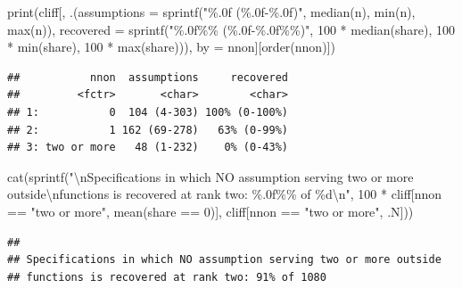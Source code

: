 \documentclass[
  11pt,
]{article}
\newenvironment{Shaded}{\begin{snugshade}}{\end{snugshade}}
\newcommand{\AttributeTok}[1]{\textcolor[rgb]{0.77,0.63,0.00}{#1}}
\newcommand{\DecValTok}[1]{\textcolor[rgb]{0.00,0.00,0.81}{#1}}
\newcommand{\FunctionTok}[1]{\textcolor[rgb]{0.00,0.00,0.00}{#1}}
\newcommand{\NormalTok}[1]{#1}
\newcommand{\SpecialCharTok}[1]{\textcolor[rgb]{0.00,0.00,0.00}{#1}}
\newcommand{\StringTok}[1]{\textcolor[rgb]{0.31,0.60,0.02}{#1}}
\begin{document}
\begin{Shaded}
\begin{Highlighting}[]
\FunctionTok{print}\NormalTok{(cliff[, .(}\AttributeTok{assumptions =} \FunctionTok{sprintf}\NormalTok{(}\StringTok{"\%.0f (\%.0f{-}\%.0f)"}\NormalTok{, }\FunctionTok{median}\NormalTok{(n), }\FunctionTok{min}\NormalTok{(n), }\FunctionTok{max}\NormalTok{(n)),}
                \AttributeTok{recovered =} \FunctionTok{sprintf}\NormalTok{(}\StringTok{"\%.0f\%\% (\%.0f{-}\%.0f\%\%)"}\NormalTok{, }\DecValTok{100} \SpecialCharTok{*} \FunctionTok{median}\NormalTok{(share),}
                                    \DecValTok{100} \SpecialCharTok{*} \FunctionTok{min}\NormalTok{(share), }\DecValTok{100} \SpecialCharTok{*} \FunctionTok{max}\NormalTok{(share))), }\AttributeTok{by =}\NormalTok{ nnon][}\FunctionTok{order}\NormalTok{(nnon)])}
\end{Highlighting}
\end{Shaded}

\begin{verbatim}
##           nnon  assumptions     recovered
##         <fctr>       <char>        <char>
## 1:           0  104 (4-303) 100% (0-100%)
## 2:           1 162 (69-278)   63% (0-99%)
## 3: two or more   48 (1-232)    0% (0-43%)
\end{verbatim}

\begin{Shaded}
\begin{Highlighting}[]
\FunctionTok{cat}\NormalTok{(}\FunctionTok{sprintf}\NormalTok{(}\StringTok{"}\SpecialCharTok{\textbackslash{}n}\StringTok{Specifications in which NO assumption serving two or more outside}\SpecialCharTok{\textbackslash{}n}\StringTok{functions is recovered at rank two: \%.0f\%\% of \%d}\SpecialCharTok{\textbackslash{}n}\StringTok{"}\NormalTok{,}
            \DecValTok{100} \SpecialCharTok{*}\NormalTok{ cliff[nnon }\SpecialCharTok{==} \StringTok{"two or more"}\NormalTok{, }\FunctionTok{mean}\NormalTok{(share }\SpecialCharTok{==} \DecValTok{0}\NormalTok{)],}
\NormalTok{            cliff[nnon }\SpecialCharTok{==} \StringTok{"two or more"}\NormalTok{, .N]))}
\end{Highlighting}
\end{Shaded}

\begin{verbatim}
## 
## Specifications in which NO assumption serving two or more outside
## functions is recovered at rank two: 91% of 1080
\end{verbatim}
\end{document}
